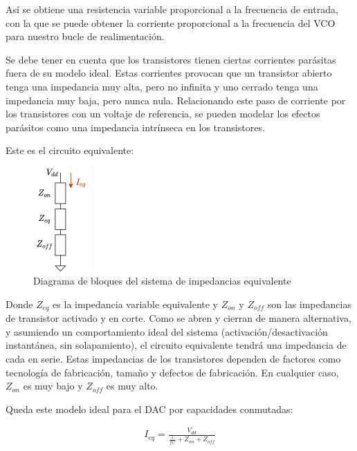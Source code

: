 \documentclass[12pt]{report} %
\begin{document}
	Así se obtiene una resistencia variable proporcional a la frecuencia de entrada, con la que se puede obtener la corriente proporcional a la frecuencia del VCO para nuestro bucle de realimentación.
	
	Se debe tener en cuenta que los transistores tienen ciertas corrientes parásitas fuera de su modelo ideal. Estas corrientes provocan que un transistor abierto tenga una impedancia muy alta, pero no infinita y uno cerrado tenga una impedancia muy baja, pero nunca nula. Relacionando este paso de corriente por los transistores con un voltaje de referencia, se pueden modelar los efectos parásitos como una impedancia intrínseca en los transistores.
	
	Este es el circuito equivalente:
	\begin{figure}[H]
		\includegraphics[width=0.2\textwidth]{sw-capacities-var-res-block.png}
		\caption[Diagrama de bloques del sistema de impedancias equivalente]{Diagrama de bloques del sistema de impedancias equivalente}
		\label{fig:sw-capacities-var-res-block.png}
	\end{figure}
	
	Donde $Z_{eq}$ es la impedancia variable equivalente y $Z_{on}$ y $Z_{off}$ son las impedancias de transistor activado y en corte. Como se abren y cierran de manera alternativa, y asumiendo un comportamiento ideal del sistema (activación/desactivación instantánea, sin solapamiento), el circuito equivalente tendrá una impedancia de cada en serie. Estas impedancias de los transistores dependen de factores como tecnología de fabricación, tamaño y defectos de fabricación. En cualquier caso, $Z_{on}$ es muy bajo y $Z_{off}$ es muy alto.
	
	Queda este modelo ideal para el DAC por capacidades conmutadas:
	
	\begin{figure}[H]
		\label{sw-capacities-i_eq}
		\begin{equation}
		\begin{array}{c}
		I_{eq} = \frac{V_{dd}}{\frac{1}{fC} + Z_{on} + Z_{off}} \\
		\end{array}
		\end{equation}
	\end{figure}
	
\end{document}
